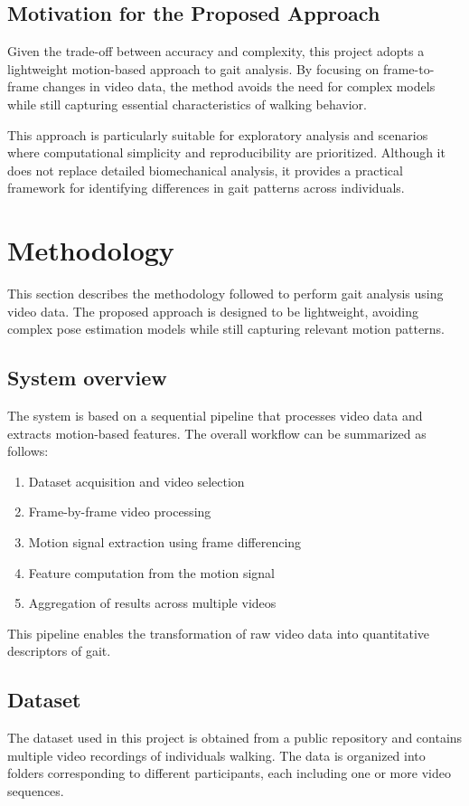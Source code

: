 \documentclass[12pt,a4paper]{article} %
\begin{document}
\subsection{Motivation for the Proposed Approach}

Given the trade-off between accuracy and complexity, this project adopts a lightweight motion-based approach to gait analysis. By focusing on frame-to-frame changes in video data, the method avoids the need for complex models while still capturing essential characteristics of walking behavior.

This approach is particularly suitable for exploratory analysis and scenarios where computational simplicity and reproducibility are prioritized. Although it does not replace detailed biomechanical analysis, it provides a practical framework for identifying differences in gait patterns across individuals.
\clearpage

\section{Methodology}
This section describes the methodology followed to perform gait analysis using video data. The proposed approach is designed to be lightweight, avoiding complex pose estimation models while still capturing relevant motion patterns.

\subsection{System overview}
The system is based on a sequential pipeline that processes video data and extracts motion-based features. The overall workflow can be summarized as follows:
\begin{enumerate}
  \item Dataset acquisition and video selection
  \item Frame-by-frame video processing
  \item Motion signal extraction using frame differencing
  \item Feature computation from the motion signal
  \item Aggregation of results across multiple videos
\end{enumerate}

This pipeline enables the transformation of raw video data into quantitative descriptors of gait.

\subsection{Dataset}
The dataset used in this project is obtained from a public repository and contains multiple video recordings of individuals walking. The data is organized into folders corresponding to different participants, each including one or more video sequences.
\end{document}
